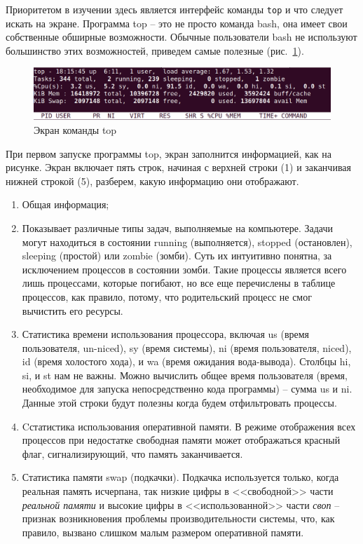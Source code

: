 \documentclass[12pt]{article}
\providecommand{\tightlist}{%
  \setlength{\itemsep}{0pt}\setlength{\parskip}{0pt}}
\begin{document}
Приоритетом в изучении здесь является интерфейс команды \texttt{top} и
что следует искать на экране. Программа top -- это не просто команда bash,
она имеет свои собственные обширные возможности. Обычные пользователи
bash не используют большинство этих возможностей, приведем самые
полезные (рис.~\ref{fig:topscreen}).
\begin{figure}[tbh]
  \centering
  \includegraphics[width=0.9\linewidth]{blog/2019/bash-essentials/top-header.png}

  \caption{Экран команды top}
  \label{fig:topscreen}
\end{figure}

При первом запуске программы top, экран заполнится информацией, как на
рисунке. Экран включает пять строк, начиная с верхней строки (1) и
заканчивая нижней строкой (5), разберем, какую информацию они
отображают.
\begin{enumerate}
\tightlist
\item
  Общая информация;
\item
  Показывает различные типы задач, выполняемые на компьютере. Задачи
  могут находиться в состоянии running (выполняется), stopped
  (остановлен), sleeping (простой) или zombie (зомби). Суть их
  интуитивно понятна, за исключением процессов в состоянии зомби. Такие
  процессы является всего лишь процессами, которые погибают, но все еще
  перечислены в таблице процессов, как правило, потому, что родительский
  процесс не смог вычистить его ресурсы.
\item
  Статистика времени использования процессора, включая us (время
  пользователя, un-niced), sy (время системы), ni (время пользователя,
  niced), id (время холостого хода), и wa (время ожидания вода-вывода). Столбцы
  hi, si, и st нам не важны. Можно вычислить общее время пользователя
  (время, необходимое для запуска непосредственно кода программы) --
  сумма us и ni. Данные этой строки будут полезны когда будем
  отфильтровать процессы.
\item
  Cстатистика использования оперативной памяти. В режиме отображения всех
  процессов при недостатке свободная памяти может отображаться красный
  флаг, сигнализирующий, что память заканчивается.
\item
  Статистика памяти swap (подкачки). Подкачка используется только,
  когда реальная память исчерпана, так низкие цифры в <<свободной>> части
  \emph{реальной памяти} и высокие цифры в <<использованной>> части
  \emph{своп} -- признак возникновения проблемы производительности
  системы, что, как правило, вызвано слишком малым размером оперативной
  памяти.
\end{enumerate}
\end{document}
